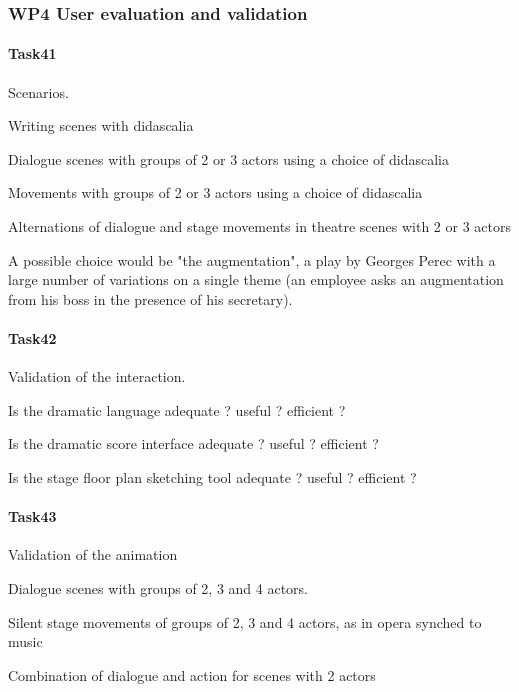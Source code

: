 \subsubsection{WP4 User evaluation and validation}

\paragraph{Task41} Scenarios.

Writing scenes with didascalia 

Dialogue scenes with groups of 2 or  3  actors using a choice of didascalia

Movements with groups of 2 or 3 actors using a choice of didascalia

Alternations of dialogue and stage movements in theatre scenes with 2 or 3 actors

A possible choice would be "the augmentation", a play by Georges Perec with a large number of variations
on a single theme (an employee asks an augmentation from his boss in the presence of his secretary).



\paragraph{Task42} Validation of the interaction.

Is the dramatic language adequate ? useful ?  efficient  ? 

Is the dramatic score interface  adequate ? useful ?  efficient  ? 

Is the stage floor plan sketching tool adequate ? useful ?  efficient  ? 



\paragraph{Task43} Validation of the animation

Dialogue scenes  with groups of 2, 3 and 4 actors.

Silent stage movements of groups of 2, 3 and 4 actors, as in opera synched to music

Combination of dialogue and action for scenes with 2 actors



\endinput

